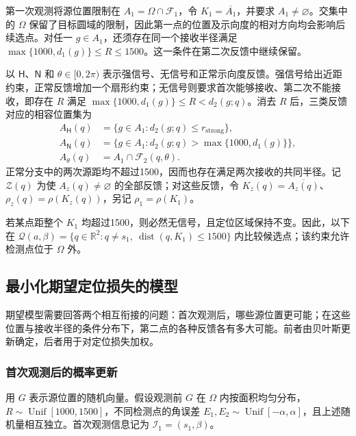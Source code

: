 \documentclass[UTF8,a4paper,zihao=-4,fontset=none]{ctexart}
\begin{document}
第一次观测将源位置限制在 \(A_1=\Omega\cap\mathcal F_1\)，令 \(K_1=\overline{A_1}\)，并要求 \(A_1\ne\varnothing\)。交集中的 \(\Omega\) 保留了目标圆域的限制，因此第一点的位置及示向度的相对方向均会影响后续选点。对任一 \(g\in A_1\)，还须存在同一个接收半径满足 \(\max\{1000,d_1(g)\}\le R\le1500\)。这一条件在第二次反馈中继续保留。

以 \(\mathsf H\)、\(\mathsf N\) 和 \(\theta\in[0,2\pi)\) 表示强信号、无信号和正常示向度反馈。强信号给出近距约束，正常反馈增加一个扇形约束；无信号则要求首次能够接收、第二次不能接收，即存在 \(R\) 满足 \(\max\{1000,d_1(g)\}\le R<d_2(g;q)\)。消去 \(R\) 后，三类反馈对应的相容位置集为
\begin{equation}
\begin{aligned}
A_{\mathsf H}(q)&=\{g\in A_1:d_2(g;q)\le r_{\mathrm{strong}}\},\\
A_{\mathsf N}(q)&=\{g\in A_1:d_2(g;q)>\max\{1000,d_1(g)\}\},\\
A_\theta(q)&=A_1\cap\mathcal F_2(q,\theta).
\end{aligned}
\label{eq:q2-pair-regions}
\end{equation}
正常分支中的两次源距均不超过1500，因而也存在满足两次接收的共同半径。记 \(\mathcal Z(q)\) 为使 \(A_z(q)\ne\varnothing\) 的全部反馈；对这些反馈，令 \(K_z(q)=\overline{A_z(q)}\)、\(\rho_z(q)=\rho(K_z(q))\)，另记 \(\rho_1=\rho(K_1)\)。

若某点距整个 \(K_1\) 均超过1500，则必然无信号，且定位区域保持不变。因此，以下在 \(\mathcal Q(a,\beta)=\{q\in\mathbb R^2:q\ne s_1,\ \operatorname{dist}(q,K_1)\le1500\}\) 内比较候选点；该约束允许检测点位于 \(\Omega\) 外。

\subsection{最小化期望定位损失的模型}

期望模型需要回答两个相互衔接的问题：首次观测后，哪些源位置更可能；在这些位置与接收半径的条件分布下，第二点的各种反馈各有多大可能。前者由贝叶斯更新确定，后者用于对定位损失加权。

\subsubsection{首次观测后的概率更新}

用 \(G\) 表示源位置的随机向量。假设观测前 \(G\) 在 \(\Omega\) 内按面积均匀分布，\(R\sim\operatorname{Unif}[1000,1500]\)，不同检测点的角误差 \(E_1,E_2\sim\operatorname{Unif}[-\alpha,\alpha]\)，且上述随机量相互独立。首次观测信息记为 \(\mathcal I_1=(s_1,\beta)\)。
\end{document}
